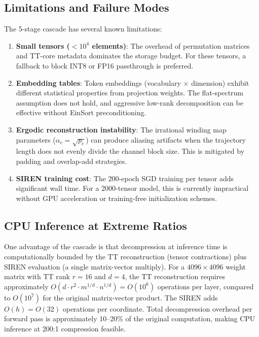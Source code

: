 \documentclass[11pt,a4paper]{article}
\begin{document}
\subsection{Limitations and Failure Modes}

The 5-stage cascade has several known limitations:

\begin{enumerate}
	\item \textbf{Small tensors ($< 10^4$ elements)}: The overhead of permutation
	      matrices and TT-core metadata dominates the storage budget. For these
	      tensors, a fallback to block INT8 or FP16 passthrough is preferred.
	\item \textbf{Embedding tables}: Token embeddings (vocabulary $\times$
	      dimension) exhibit different statistical properties from projection
	      weights. The flat-spectrum assumption does not hold, and aggressive
	      low-rank decomposition can be effective without EinSort preconditioning.
	\item \textbf{Ergodic reconstruction instability}: The irrational winding
	      map parameters ($\alpha_c = \sqrt{p_c}$) can produce aliasing artifacts
	      when the trajectory length does not evenly divide the channel block
	      size. This is mitigated by padding and overlap-add strategies.
	\item \textbf{SIREN training cost}: The 200-epoch SGD training per tensor
	      adds significant wall time. For a 2000-tensor model, this is currently
	      impractical without GPU acceleration or training-free initialization
	      schemes.
\end{enumerate}

\subsection{CPU Inference at Extreme Ratios}

One advantage of the cascade is that decompression at inference time is
computationally bounded by the TT reconstruction (tensor contractions) plus
SIREN evaluation (a single matrix-vector multiply). For a $4096 \times 4096$
weight matrix with TT rank $r=16$ and $d=4$, the TT reconstruction requires
approximately $O(d \cdot r^2 \cdot m^{1/d} \cdot n^{1/d}) = O(10^6)$
operations per layer, compared to $O(10^7)$ for the original matrix-vector
product. The SIREN adds $O(h) = O(32)$ operations per coordinate. Total
decompression overhead per forward pass is approximately 10--20\% of the
original computation, making CPU inference at 200:1 compression feasible.
\end{document}
